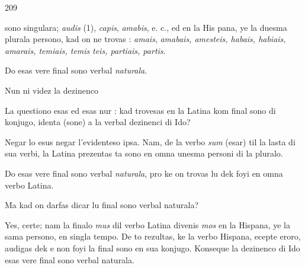 \begin{VUpage}[213]{209}

\VUcontinue
sono singulara; \textit{audis} (1), \textit{capis}, \textit{amabis}, e. c., ed en la His\cc
pana, ye la duesma plurala persono, kad on ne trovas : \textit{amais},\nl
\textit{amabais, amesteis, habais, habiais, amarais, temiais, temis}\cc
\textit{teis, partiais, partis}.

Do  esas vere final sono verbal \textit{naturala}.

Nun ni videz la dezinenco 

La questiono esas ed esas nur : kad  trovesas en la\nl
Latina kom final sono di konjugo, identa (sone) a la verbal\nl
dezinenci  di Ido?

Negar lo esus negar l'evidenteso ipsa. Nam, de la verbo\nl
\textit{sum} (esar) til la lasta di sua verbi, la Latina prezentas ta\nl
sono en omna unesma personi di la pluralo.

Do  esas vere final sono verbal \textit{naturala}, pro ke on\nl
trovas lu dek foyi en omna verbo Latina.

Ma  kad on darfas dicar lu final sono verbal naturala?\parplein

Yes, certe; nam la finalo \textit{mus} dil verbo Latina divenis\nl
\textit{mos} en la Hispana, ye la sama persono, en singla tempo.\nl
De to rezultas, ke la verbo Hispana, ecepte eroro, audigas\nl
dek e non foyi la final sono  en sua konjugo. Konseque\nl
la dezinenco  di Ido esas vere final sono verbal naturala.\parplein


\end{VUpage}
